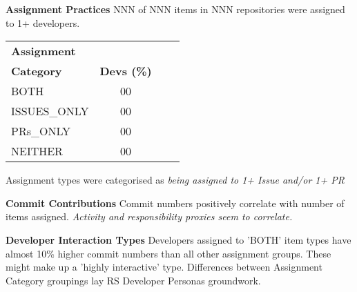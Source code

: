 \documentclass[25pt, a0paper, landscape, margin=10mm, innermargin=15mm, blockverticalspace=15mm, subcolspace=8mm, dvipsnames]{tikzposter} %
\begin{document}
\begin{columns}
{\begin{multicols}{2}
{    \textbf{Assignment Practices} \newline  
    NNN of NNN items in NNN repositories were assigned to 1+ developers.   
    \begin{center}
    \begin{tabular}{ l c c c} 
     \textbf{Assignment}\\ \textbf{Category} & \textbf{Devs (\%)} \\
     BOTH & 00 \\ 
     ISSUES\_ONLY & 00 \\
     PRs\_ONLY & 00 \\
     NEITHER & 00 \\ 
    \end{tabular}
    \end{center}
    Assignment types were categorised as \textit{being assigned to 1+ Issue and/or 1+ PR}
    \vspace*{0.4em} 
    \par
    
   
    \textbf{Commit Contributions} \newline 
    Commit numbers positively correlate with number of items assigned. \textit{Activity and responsibility proxies seem to correlate.}
    \vspace*{0.4em} 
    \par
    
    \textbf{Developer Interaction Types} \newline 
    Developers assigned to 'BOTH' item types have almost 10\% higher commit numbers than all other assignment groups. 
    These might make up a 'highly interactive' type. 
    Differences between Assignment Category groupings lay RS Developer Personas groundwork.
    \par
    }
    \end{multicols}
}
\end{columns}
\end{document}
